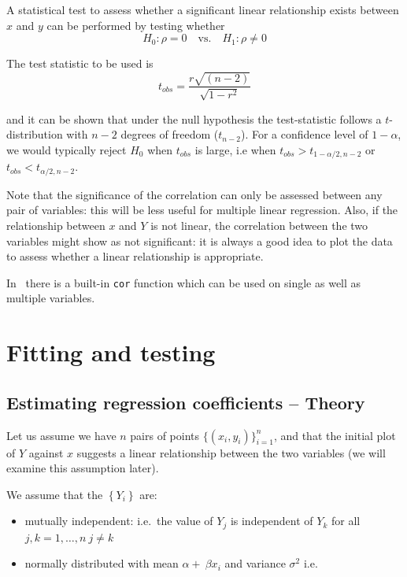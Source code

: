 \documentclass[12pt,a4paper,openany,twoside]{report}
\theoremstyle{definition}
\theoremstyle{remark}
\theoremstyle{plain}
\newcommand{\sR}[1]{\textbf{R}\,}
\theoremstyle{definition}
\theoremstyle{definition}
\theoremstyle{definition}
\theoremstyle{remark}
\begin{document}
A statistical test to assess whether a significant linear relationship exists between \(x\) and \(y\) can be performed by testing whether
\[H_0 : \rho = 0 \quad \text{vs.} \quad  H_1 : \rho \neq 0 \]

The test statistic to be used is
\[ t_{obs} = \frac{r \sqrt{(n-2)}}{\sqrt{1-r^2}}  \]

and it can be shown that under the null hypothesis the test-statistic follows a \(t\)-distribution with \(n-2\) degrees of freedom (\(t_{n-2}\)).
For a confidence level of \(1-\alpha\), we would typically reject \(H_0\) when \(t_{obs}\) is large, i.e when \(t_{obs} > t_{1-\alpha/2, n-2}\) or \(t_{obs} < t_{\alpha/2, n-2}\).

Note that the significance of the correlation can only be assessed between any pair of variables: this will be less useful for multiple linear regression.
Also, if the relationship between \(x\) and \(Y\) is not linear, the correlation between the two variables might show as not significant: it is always a good idea to plot the data to assess whether a linear relationship is appropriate.

In \sR~there is a built-in \texttt{cor} function which can be used on single as well as multiple variables.

\hypertarget{slrfitting}{%
\section{Fitting and testing}\label{slrfitting}}

\hypertarget{slrtheory}{%
\subsection{Estimating regression coefficients -- Theory}\label{slrtheory}}

Let us assume we have \(n\) pairs of points
\(\{(x_{i},y_{i})\}_{i = 1}^{n}\), and that the
initial plot of \(Y\) against \(x\) suggests a linear relationship
between the two variables (we will examine this assumption later).

We assume that the \(\left\{ Y_{i} \right\}\) are:

\begin{itemize}
\item
  mutually independent: i.e.~the value of \(Y_{j}\) is independent of \(Y_{k}\) for all \(j,k = 1,\ldots,n\ j \neq k\)
\item
  normally distributed with mean \(\alpha + \ \beta x_{i}\) and variance \(\sigma^{2}\) i.e.
\end{itemize}
\end{document}

